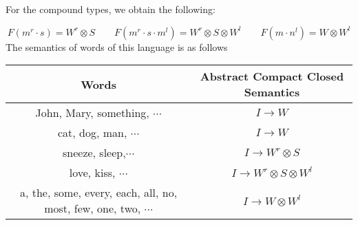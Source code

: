 \noindent
For the compound types, we obtain the following:

\[
F(m^r \cdot s) = W^r \otimes S\qquad
F(m^r \cdot s \cdot m^l) = W^r \otimes S \otimes W^l\qquad
F(m \cdot n^l) = W \otimes W^l
\]
The semantics of words of this language is as follows

\begin{center}
\begin{tabular}{c|c}
 Words & Abstract Compact Closed Semantics\\
\hline
 John, Mary, something, $\cdots$ & $I \to W$\\
 cat, dog, man, $\cdots$ & $I \to W$\\
 sneeze, sleep,$\cdots$ & $I \to W^r \otimes S$\\
 love, kiss, $\cdots$ & $I \to W^r \otimes S \otimes W^l$\\
 a, the, some, every, each, all, no, most, few, one, two, $\cdots$ & $I \to W \otimes W^l$
\end{tabular}
\end{center}


